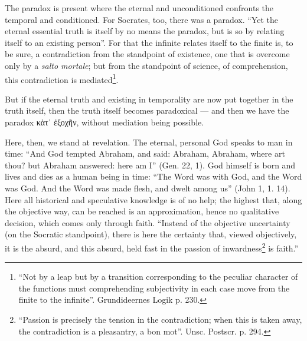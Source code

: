 \documentclass[12pt,a4paper]{book}
\newcommand{\opage}[1]{\marginnote{\footnotesize\textit{[#1]}}}
\begin{document}
The paradox is present where the eternal and unconditioned confronts the temporal and conditioned. For Socrates, too, there was a paradox. ``Yet the eternal essential truth is itself by no means the paradox, but is so by relating itself to an existing person''. For that the infinite relates itself to the finite is, to be sure, a contradiction from the standpoint of existence, one that is overcome only by a \textit{salto mortale}; but from the standpoint of science, of comprehension, this contradiction is mediated\footnote{``Not by a leap but by a transition corresponding to the peculiar character of the functions must comprehending subjectivity in each case move from the finite to the infinite''. Grundideernes Logik p. 230.}.

But if the eternal truth and existing in temporality are now put together in the truth itself, then the truth itself becomes paradoxical --- and then we have the paradox κὰτ᾽ ἐξοχῆν, without mediation being possible.

Here, then, we stand at revelation. The eternal, personal God speaks to man in time: ``And God tempted Abraham, and said: Abraham, Abraham, where art thou? but Abraham answered: here am I'' (Gen. 22, 1). God himself is born and lives and dies as a human being in time: ``The Word was with God, and the Word was God. And the Word was made flesh, and dwelt among us'' (John 1, 1. 14). Here all historical and speculative knowledge is of no help; the highest that, along the objective way,
\opage{24}\setcounter{footnote}{0}%
can be reached is an approximation, hence no qualitative decision, which comes only through faith. ``Instead of the objective uncertainty (on the Socratic standpoint), there is here the certainty that, viewed objectively, it is the absurd, and this absurd, held fast in the passion of inwardness\footnote{``Passion is precisely the tension in the contradiction; when this is taken away, the contradiction is a pleasantry, a bon mot''. Unsc. Postscr. p. 294.} is faith.''
\end{document}
